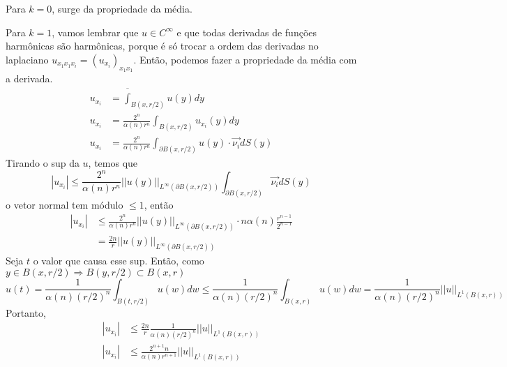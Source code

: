 \documentclass[11pt]{article}
\begin{document}
Para \( k=0 \), surge da propriedade da média.

Para \( k=1 \), vamos lembrar que \( u \in C^\infty \) e que todas derivadas de funções harmônicas são harmônicas, porque é só trocar a ordem das derivadas no laplaciano \( u_{x_1x_1x_i} = (u_{x_i})_{x_1x_1} \). Então, podemos fazer a propriedade da média com a derivada.
\begin{align*}
	u_{x_i} &= \overline{\int}_{B(x, r/2)} u(y) dy \\
	u_{x_i} &= \frac{2^n}{\alpha (n) r^n} \int_{B(x, r/2)} u_{x_i} (y) dy \\
	u_{x_i} &= \frac{2^n}{\alpha (n) r^n} \int_{\partial B(x, r/2)} u(y) \cdot \vec{\nu_{i}} dS(y)
\end{align*}
Tirando o sup da \( u \), temos que \[ |u_{x_i}| \leq \frac{2^n}{\alpha (n) r^n} || u(y) ||_{L^\infty (\partial B(x, r/2))} \int_{\partial B(x, r/2)} \vec{\nu_i} dS(y)\] o vetor normal tem módulo \( \leq 1 \), então \begin{align*}
	 |u_{x_i }|&\leq \frac{2^n}{\alpha (n) r^n} || u(y) ||_{L^\infty (\partial B(x, r/2))} \cdot n \alpha (n) \frac{r^{n-1}}{2^{n-1}} \\
	 &= \frac{2n}{r} || u(y) ||_{L^\infty (\partial B(x, r/2))} 
\end{align*}
Seja \( t \) o valor que causa esse sup. Então, como \(y \in B(x,r/2)\Rightarrow B(y, r/2) \subset B(x, r) \)\[ u(t) = \frac{1}{\alpha (n) (r/2)^n } \int_{B(t, r/2)} u(w) dw \leq \frac{1}{\alpha (n) (r/2)^n } \int_{B(x, r)} u(w) dw =  \frac{1}{\alpha (n) (r/2)^n }  || u ||_{L^1 (B(x,r))}  \] Portanto, \begin{align*}
	|u_{x_i}| &\leq \frac{2n}{r} \frac{1}{\alpha (n) (r/2)^n }|| u ||_{L^1 (B(x,r))} \\
	|u_{x_i}| &\leq \frac{2^{n+1} n}{\alpha(n) r^{n+1}}|| u ||_{L^1 (B(x,r))}  
\end{align*}
\end{document}
